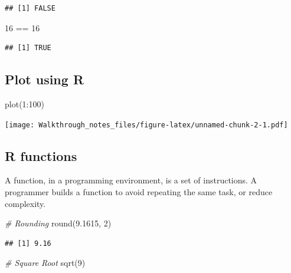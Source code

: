 \documentclass[
]{article}
\newenvironment{Shaded}{\begin{snugshade}}{\end{snugshade}}
\newcommand{\CommentTok}[1]{\textcolor[rgb]{0.56,0.35,0.01}{\textit{#1}}}
\newcommand{\DecValTok}[1]{\textcolor[rgb]{0.00,0.00,0.81}{#1}}
\newcommand{\FloatTok}[1]{\textcolor[rgb]{0.00,0.00,0.81}{#1}}
\newcommand{\FunctionTok}[1]{\textcolor[rgb]{0.00,0.00,0.00}{#1}}
\newcommand{\NormalTok}[1]{#1}
\newcommand{\SpecialCharTok}[1]{\textcolor[rgb]{0.00,0.00,0.00}{#1}}
\begin{document}
\begin{verbatim}
## [1] FALSE
\end{verbatim}

\begin{Shaded}
\begin{Highlighting}[]
\DecValTok{16} \SpecialCharTok{==} \DecValTok{16}
\end{Highlighting}
\end{Shaded}

\begin{verbatim}
## [1] TRUE
\end{verbatim}

\hypertarget{plot-using-r}{%
\subsection{Plot using R}\label{plot-using-r}}

\begin{Shaded}
\begin{Highlighting}[]
\FunctionTok{plot}\NormalTok{(}\DecValTok{1}\SpecialCharTok{:}\DecValTok{100}\NormalTok{)}
\end{Highlighting}
\end{Shaded}

\texttt{[image: Walkthrough\_notes\_files/figure-latex/unnamed-chunk-2-1.pdf]}

\hypertarget{r-functions}{%
\subsection{R functions}\label{r-functions}}

A function, in a programming environment, is a set of instructions. A
programmer builds a function to avoid repeating the same task, or reduce
complexity.

\begin{Shaded}
\begin{Highlighting}[]
\CommentTok{\# Rounding}
\FunctionTok{round}\NormalTok{(}\FloatTok{9.1615}\NormalTok{, }\DecValTok{2}\NormalTok{)}
\end{Highlighting}
\end{Shaded}

\begin{verbatim}
## [1] 9.16
\end{verbatim}

\begin{Shaded}
\begin{Highlighting}[]
\CommentTok{\# Square Root}
\FunctionTok{sqrt}\NormalTok{(}\DecValTok{9}\NormalTok{)}
\end{Highlighting}
\end{Shaded}
\end{document}
